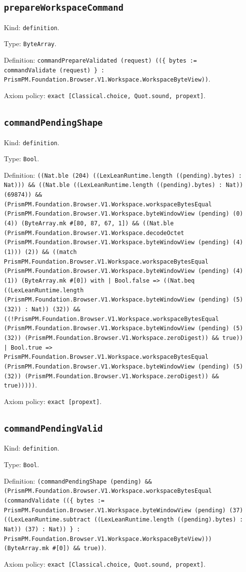 \documentclass[11pt]{article}
\begin{document}
\subsection*{\texttt{prepareWorkspaceCommand}}
\noindent Kind: \texttt{definition}.\par
\noindent Type: \texttt{ByteArray}.\par
\noindent Definition: \texttt{commandPrepareValidated (request) ((\{ bytes := commandValidate (request) \} : PrismPM.Foundation.Browser.V1.Workspace.WorkspaceByteView))}.\par
\noindent Axiom policy: \texttt{exact [Classical.choice, Quot.sound, propext]}.\par
\subsection*{\texttt{commandPendingShape}}
\noindent Kind: \texttt{definition}.\par
\noindent Type: \texttt{Bool}.\par
\noindent Definition: \texttt{((Nat.ble (204) ((LexLeanRuntime.length ((pending).bytes) : Nat))) \&\& ((Nat.ble ((LexLeanRuntime.length ((pending).bytes) : Nat)) (69874)) \&\& (PrismPM.Foundation.Browser.V1.Workspace.workspaceBytesEqual (PrismPM.Foundation.Browser.V1.Workspace.byteWindowView (pending) (0) (4)) (ByteArray.mk \#[80, 87, 67, 1]) \&\& ((Nat.ble (PrismPM.Foundation.Browser.V1.Workspace.decodeOctet (PrismPM.Foundation.Browser.V1.Workspace.byteWindowView (pending) (4) (1))) (2)) \&\& ((match PrismPM.Foundation.Browser.V1.Workspace.workspaceBytesEqual (PrismPM.Foundation.Browser.V1.Workspace.byteWindowView (pending) (4) (1)) (ByteArray.mk \#[0]) with | Bool.false => ((Nat.beq ((LexLeanRuntime.length (PrismPM.Foundation.Browser.V1.Workspace.byteWindowView (pending) (5) (32)) : Nat)) (32)) \&\& ((!PrismPM.Foundation.Browser.V1.Workspace.workspaceBytesEqual (PrismPM.Foundation.Browser.V1.Workspace.byteWindowView (pending) (5) (32)) (PrismPM.Foundation.Browser.V1.Workspace.zeroDigest)) \&\& true)) | Bool.true => PrismPM.Foundation.Browser.V1.Workspace.workspaceBytesEqual (PrismPM.Foundation.Browser.V1.Workspace.byteWindowView (pending) (5) (32)) (PrismPM.Foundation.Browser.V1.Workspace.zeroDigest)) \&\& true)))))}.\par
\noindent Axiom policy: \texttt{exact [propext]}.\par
\subsection*{\texttt{commandPendingValid}}
\noindent Kind: \texttt{definition}.\par
\noindent Type: \texttt{Bool}.\par
\noindent Definition: \texttt{(commandPendingShape (pending) \&\& (PrismPM.Foundation.Browser.V1.Workspace.workspaceBytesEqual (commandValidate ((\{ bytes := PrismPM.Foundation.Browser.V1.Workspace.byteWindowView (pending) (37) ((LexLeanRuntime.subtract ((LexLeanRuntime.length ((pending).bytes) : Nat)) (37) : Nat)) \} : PrismPM.Foundation.Browser.V1.Workspace.WorkspaceByteView))) (ByteArray.mk \#[0]) \&\& true))}.\par
\noindent Axiom policy: \texttt{exact [Classical.choice, Quot.sound, propext]}.\par
\end{document}
